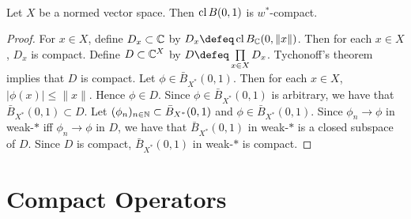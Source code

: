 \documentclass{book}
\begin{document}
	
	
	\begin{ex}  \\
		Let $X$ be a normed vector space. Then $\operatorname{cl} B(0,1)$ is $w^*$-compact. 
	\end{ex}

	\begin{proof}
		For $x \in X$, define $D_x \subset \mathbb{C}$ by $D_x \defeq \cl B_{\C}(0, \|x\|)$. Then for each $x \in X$, $D_x$ is compact. Define $D \subset \mathbb{C}^X$ by $D \defeq \prod\limits_{x \in X} D_x$. Tychonoff's theorem implies that $D$ is compact. Let $\phi \in \bar{B}_{X^*}(0,1)$. Then for each $x \in X$, $|\phi(x)| \leq \|x\|$. Hence $\phi \in D$. Since $\phi \in \bar{B}_{X^*}(0,1)$ is arbitrary, we have that $\bar{B}_{X^*}(0,1) \subset D$. Let $(\phi_n)_{n \in \mathbb{N}} \subset \bar{B}_{X^*}(0,1)$ and $\phi \in \bar{B}_{X^*}(0,1)$. Since $\phi_n \rightarrow \phi$ in weak-$*$ iff $\phi_n \rightarrow \phi$ in $D$, we have that $\bar{B}_{X^*}(0,1)$ in weak-$*$ is a closed subspace of $D$. Since $D$ is compact, $\bar{B}_{X^*}(0,1)$ in weak-$*$ is compact. 
		
 	\end{proof}







	
	
	
	






\newpage
\section{Compact Operators}


\begin{defn}

\end{defn}























	\newpage
\end{document}
